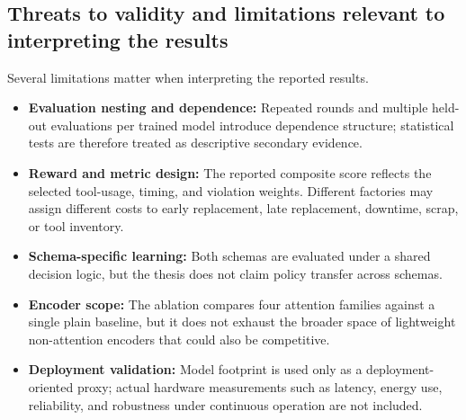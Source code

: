 \documentclass[12pt,oneside]{book}
\begin{document}
\subsection{Threats to validity and limitations relevant to interpreting the results}
Several limitations matter when interpreting the reported results.
\begin{itemize}
\item \textbf{Evaluation nesting and dependence:} Repeated rounds and multiple held-out evaluations per trained model introduce dependence structure; statistical tests are therefore treated as descriptive secondary evidence.
\item \textbf{Reward and metric design:} The reported composite score reflects the selected tool-usage, timing, and violation weights. Different factories may assign different costs to early replacement, late replacement, downtime, scrap, or tool inventory.
\item \textbf{Schema-specific learning:} Both schemas are evaluated under a shared decision logic, but the thesis does not claim policy transfer across schemas.
\item \textbf{Encoder scope:} The ablation compares four attention families against a single plain baseline, but it does not exhaust the broader space of lightweight non-attention encoders that could also be competitive.
\item \textbf{Deployment validation:} Model footprint is used only as a deployment-oriented proxy; actual hardware measurements such as latency, energy use, reliability, and robustness under continuous operation are not included.
\end{itemize}
\end{document}

